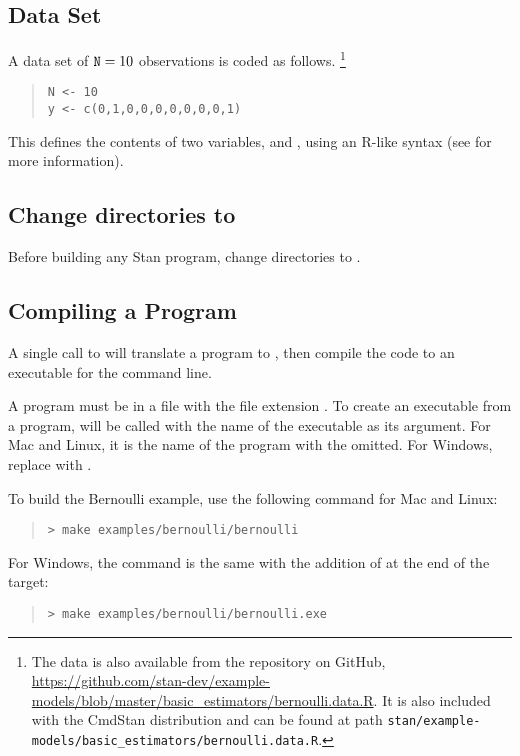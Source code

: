 \subsection{Data Set}

A data set of $\mbox{{\tt N}}=10$ observations is coded as follows.
%
\footnote{
The data is also available from the  repository
on GitHub,
\url{https://github.com/stan-dev/example-models/blob/master/basic_estimators/bernoulli.data.R}.
It is also included with the CmdStan distribution and can be found at path
\nolinkurl{stan/example-models/basic_estimators/bernoulli.data.R}.
}
%
\begin{quote}
\begin{Verbatim}
N <- 10
y <- c(0,1,0,0,0,0,0,0,0,1)
\end{Verbatim}
\end{quote}
%
This defines the contents of two variables,  and ,
using an R-like syntax (see  for more information).

\subsection{Change directories to }

Before building any Stan program, change directories to .

\subsection{Compiling a \Stan Program}

A single call to  will translate a \Stan program to \Cpp,
then compile the \Cpp code to an executable for the command line.

A \Stan program must be in a file with the file extension
. To create an executable from a \Stan program,
 will be called with the name of the executable as its
argument. For Mac and Linux, it is the name of the \Stan program with
the  omitted. For Windows, replace  with
.

To build the Bernoulli example, use
the following command for Mac and Linux:
%
\begin{quote}
\begin{Verbatim}[fontshape=sl]
> make examples/bernoulli/bernoulli
\end{Verbatim}
\end{quote}
%
For Windows, the command is the same with the addition of 
at the end of the target:
\begin{quote}
\begin{Verbatim}[fontshape=sl]
> make examples/bernoulli/bernoulli.exe
\end{Verbatim}
\end{quote}

